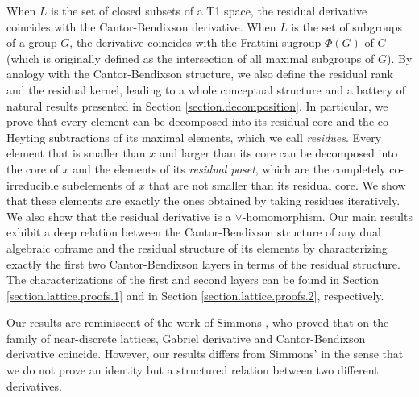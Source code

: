 \documentclass{article}
\newcommand{\comm}[2]{\begin{tcolorbox}[colback=gray!40]\textbf{Comment} (#1) : #2\end{tcolorbox}}
\begin{document}
When $L$ is the set of closed subsets of a T1 space, the residual derivative coincides with the Cantor-Bendixson derivative. When $L$ is the set of subgroups of a group $G$, the derivative coincides with the Frattini sugroup 
$\Phi(G)$ of $G$ (which is originally defined as the intersection of all maximal subgroups of $G$). By analogy with the Cantor-Bendixson structure, we also define the residual rank and the residual kernel, leading to a whole conceptual structure and a battery of natural results presented in Section \ref{section.decomposition}. In particular, we prove that every element can be decomposed into its residual core and the co-Heyting subtractions of its maximal elements, which we call \textit{residues}. Every element that is smaller than $x$ and larger than its core can be decomposed into the core of $x$ and 
the elements of its \textit{residual poset}, which are the completely co-irreducible subelements of $x$ that are not smaller than its residual core. We show that these elements are exactly the ones obtained by taking residues iteratively. We also show that the residual derivative is a $\vee$-homomorphism.
Our main results exhibit a deep relation between the Cantor-Bendixson structure of any dual algebraic coframe and the residual structure of its elements by characterizing exactly the first two Cantor-Bendixson layers in terms of the residual structure. %
The characterizations of the first and second layers can be found in Section \ref{section.lattice.proofs.1} and in Section \ref{section.lattice.proofs.2}, respectively.

Our results are reminiscent of the work of Simmons \cite{Simmons_NearDiscreteness}, who proved that on the family of near-discrete lattices, Gabriel derivative and Cantor-Bendixson derivative coincide. However, our results differs from Simmons' in the sense that we do not prove an identity but a structured relation between two different derivatives. 


\end{document}
